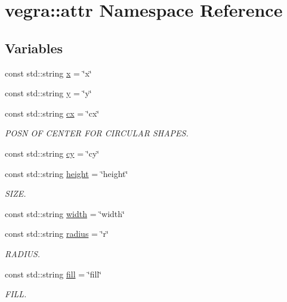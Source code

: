 \hypertarget{namespacevegra_1_1attr}{}\section{vegra\+:\+:attr Namespace Reference}
\label{namespacevegra_1_1attr}
\subsection*{Variables}
\begin{DoxyCompactItemize}
\item 
const std\+::string \mbox{\hyperlink{namespacevegra_1_1attr_aad742b5d9766de5e8de120f9ec2d606c}{x}} = \char`\"{}x\char`\"{}
\item 
const std\+::string \mbox{\hyperlink{namespacevegra_1_1attr_aa7b0fe91ac9ac2d7ef82a96fbc045cef}{y}} = \char`\"{}y\char`\"{}
\item 
const std\+::string \mbox{\hyperlink{namespacevegra_1_1attr_a2b00c1ce5fbfd6f287f04c82436cde36}{cx}} = \char`\"{}cx\char`\"{}
\begin{DoxyCompactList}\small\item\em P\+O\+SN OF C\+E\+N\+T\+ER F\+OR C\+I\+R\+C\+U\+L\+AR S\+H\+A\+P\+ES. \end{DoxyCompactList}\item 
const std\+::string \mbox{\hyperlink{namespacevegra_1_1attr_aa7ba703fc5e3503eebf09e612e0acfbe}{cy}} = \char`\"{}cy\char`\"{}
\item 
const std\+::string \mbox{\hyperlink{namespacevegra_1_1attr_a381876de77425abfb3621bf6f1988ada}{height}} = \char`\"{}height\char`\"{}
\begin{DoxyCompactList}\small\item\em S\+I\+ZE. \end{DoxyCompactList}\item 
const std\+::string \mbox{\hyperlink{namespacevegra_1_1attr_ad16d3f19ee0c2bc1624c97839c99dad6}{width}} = \char`\"{}width\char`\"{}
\item 
const std\+::string \mbox{\hyperlink{namespacevegra_1_1attr_abfc8a39fd1a64cddfd2e0c599154364b}{radius}} = \char`\"{}r\char`\"{}
\begin{DoxyCompactList}\small\item\em R\+A\+D\+I\+US. \end{DoxyCompactList}\item 
const std\+::string \mbox{\hyperlink{namespacevegra_1_1attr_a239f7c243700210a4a201335a34bcef9}{fill}} = \char`\"{}fill\char`\"{}
\begin{DoxyCompactList}\small\item\em F\+I\+LL. \end{DoxyCompactList}\item 

\end{DoxyCompactItemize}
